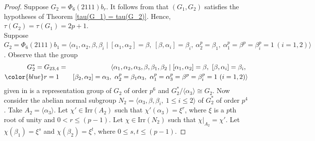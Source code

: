 \documentclass[a4paper,11pt]{amsart}
\numberwithin{equation}{section}
\numberwithin{equation}{subsection}
\newcommand{\poonam}[1]{{\color{blue} #1}}
\begin{document}
\begin{proof}
Suppose $G_2= \Phi_6(2111){b_r}$. It follows from  \cite[Proof of Theorem 4.1(xvi)]{sabnam} that $(G_1,G_2)$ satisfies the hypotheses of Theorem \ref{tau(G_1) = tau(G_2)}. Hence, $\tau(G_2)= \tau(G_1)= 2p+1$. \\


\iffalse
Suppose $G_2= \Phi_6(2111){b_1} = \langle \alpha_1, \alpha_2, \beta, \beta_i \mid [\alpha_1,\alpha_2] = \beta,\ [\beta,\alpha_i] = \beta_i,\ \alpha_2^p = \beta_1,\ \alpha_1^p = \beta^p = \beta_i^p = 1\ (i = 1,2) \rangle$. Observe that the group 
\begin{eqnarray*}
	G_2^*= G_{23,4} &=& \langle \alpha_1, \alpha_2, \alpha_3, \beta, \beta_1, \beta_2 \mid [\alpha_1,\alpha_2] = \beta,\ [\beta,\alpha_i] = \beta_i,\ \\ \poonam{r=1}
	&& [\beta_2,\alpha_2] = \alpha_3,\ 
	\alpha_2^p = \beta_1 \alpha_3,\ \alpha_1^p = \alpha_3^p = \beta^p = \beta_i^p = 1\ (i = 1,2) \rangle    
\end{eqnarray*}
given in \cite{presentation} is a representation group of $G_2$ of order $p^6$ and ${G}_2^*/ \langle \alpha_3 \rangle \cong G_2$. 
Now consider the abelian normal subgroup
$N_2=\langle \alpha_3, \beta, \beta_i,\ 1 \le i \le 2 \rangle$ of ${G}_2^*$ of order $p^4$. 
Take $A_2=\langle \alpha_3 \rangle$.
Let $\chi' \in \mathrm{Irr}(A_2)$ such that $\chi'(\alpha_3) = \xi^{r}$,
where $\xi$ is a $p$th root of unity and $0 < r \le (p-1)$. Let $\chi \in \mathrm{Irr}(N_2)$ such that $\chi|_{A_2}=\chi'$. 
Let $\chi(\beta_1) = \xi^{s}$ and $\chi(\beta_2) = \xi^{t}$, where  $0 \le s, t \le (p-1)$. 


\end{proof}
\end{document}
